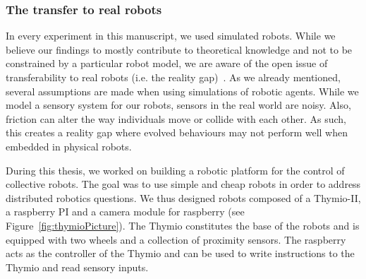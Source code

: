 		\subsubsection{The transfer to real robots}

			In every experiment in this manuscript, we used simulated robots. While we believe our findings to mostly contribute to theoretical knowledge and not to be constrained by a particular robot model, we are aware of the open issue of transferability to real robots (i.e. the reality gap)~\parencite{Jakobi1995, Mouret2012b, Doncieux2015a}. As we already mentioned, several assumptions are made when using simulations of robotic agents. While we model a sensory system for our robots, sensors in the real world are noisy. Also, friction can alter the way individuals move or collide with each other. As such, this creates a reality gap where evolved behaviours may not perform well when embedded in physical robots.

			During this thesis, we worked on building a robotic platform for the control of collective robots. The goal was to use simple and cheap robots in order to address distributed robotics questions. We thus designed robots composed of a Thymio-II, a raspberry PI and a camera module for raspberry (see Figure~\ref{fig:thymioPicture}). The Thymio constitutes the base of the robots and is equipped with two wheels and a collection of proximity sensors. The raspberry acts as the controller of the Thymio and can be used to write instructions to the Thymio and read sensory inputs.

